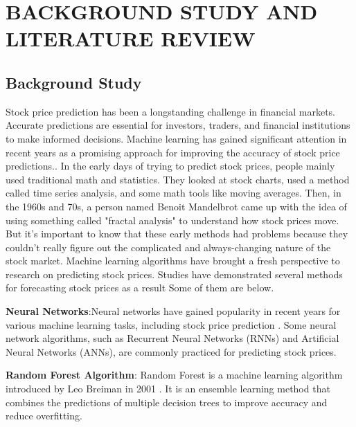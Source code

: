 \documentclass[./main.tex]{subfiles}
\begin{document}
\chapter{ BACKGROUND STUDY AND LITERATURE REVIEW }

\label{chap:background}
\section{Background Study}
Stock price prediction has been a longstanding challenge in financial markets. Accurate predictions are essential for investors, traders, and financial institutions to make informed decisions. Machine learning has gained significant attention in recent years as a promising approach for improving the accuracy of stock price predictions.\cite{CHEN2023106038}.
\noindent
 In the early days of trying to predict stock prices, people mainly used traditional math and statistics. They looked at stock charts, used a method called time series analysis, and some math tools like moving averages. Then, in the 1960s and 70s, a person named Benoit Mandelbrot came up with the idea of using something called "fractal analysis" to understand how stock prices move. But it's important to know that these early methods had problems because they couldn't really figure out the complicated and always-changing nature of the stock market.\cite{mandelbrot1963variation}
 \noindent
  Machine learning algorithms have brought a fresh perspective to research on predicting stock prices. Studies have demonstrated several methods for forecasting stock prices as a result Some of them are below.
 
  \noindent
    \textbf{Neural Networks}:Neural networks have gained popularity in recent years for various machine learning tasks, including stock price prediction \cite{ZHANG2021872}. Some neural network algorithms, such as Recurrent Neural Networks (RNNs) and Artificial Neural Networks (ANNs), are commonly practiced for predicting stock prices.
     
     
       \noindent
     \textbf{Random Forest Algorithm}: Random Forest is a machine learning algorithm introduced by Leo Breiman in 2001 \cite{breiman2001random}. It is an ensemble learning method that combines the predictions of multiple decision trees to improve accuracy and reduce overfitting.
   
\end{document}
